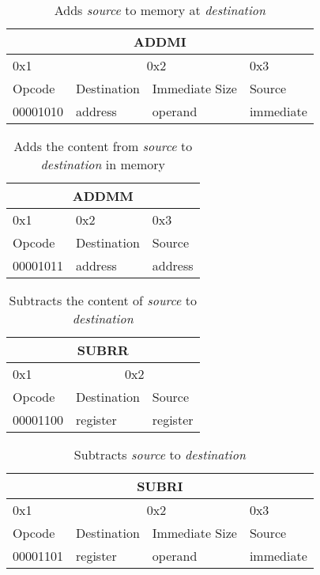\documentclass{article}
\begin{document}
\begin{table}[H]
  \centering
  \begin{tabular} { | p{2cm} | | p{2cm} | p{} | | p{2cm} |}
    \hline
    \multicolumn{4}{|c|}{ADDMI}\\
    \hline
    0x1 & \multicolumn{2}{|c|}{0x2} & 0x3\\
    \hline
    Opcode & Destination & Immediate Size & Source\\
    00001010 & address & operand & immediate\\
    \hline
  \end{tabular}
  \caption{Adds \textit{source} to memory at \textit{destination}}
\end{table}

\begin{table}[H]
  \centering
  \begin{tabular} { | p{2cm} | | p{2cm} | p{2cm} |}
    \hline
    \multicolumn{3}{|c|}{ADDMM}\\
    \hline
    0x1 & 0x2 & 0x3\\
    \hline
    Opcode & Destination & Source\\
    00001011 & address & address\\
    \hline
  \end{tabular}
  \caption{Adds the content from \textit{source} to \textit{destination} in memory}
\end{table}

\begin{table}[H]
  \centering
  \begin{tabular} { | p{2cm} | | p{2cm} | p{2cm} |}
    \hline
    \multicolumn{3}{|c|}{SUBRR}\\
    \hline
    0x1 & \multicolumn{2}{|c|}{0x2}\\
    \hline
    Opcode & Destination & Source\\
    00001100 & register & register\\
    \hline
  \end{tabular}
  \caption{Subtracts the content of \textit{source} to \textit{destination}}
\end{table}

\begin{table}[H]
  \centering
  \begin{tabular} { | p{2cm} | | p{2cm} | p{} | | p{2cm} |}
    \hline
    \multicolumn{4}{|c|}{SUBRI}\\
    \hline
    0x1 & \multicolumn{2}{|c|}{0x2} & 0x3\\
    \hline
    Opcode & Destination & Immediate Size & Source\\
    00001101 & register & operand & immediate\\
    \hline
  \end{tabular}
  \caption{Subtracts \textit{source} to \textit{destination}}
\end{table}
\end{document}
